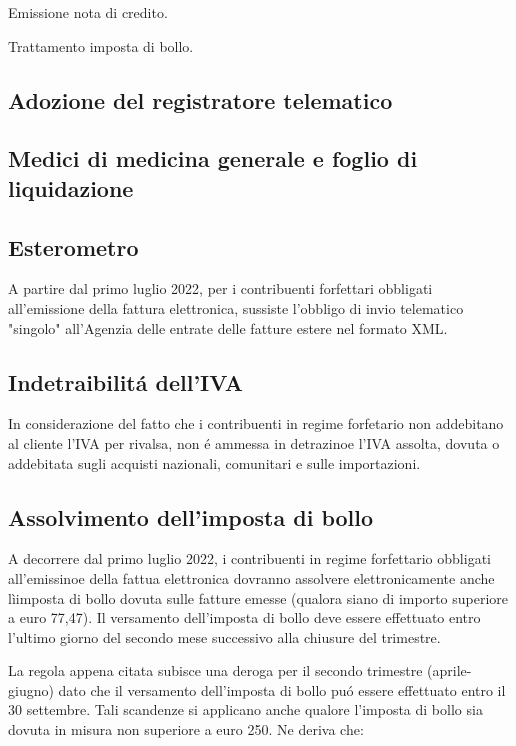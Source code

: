 \documentclass{article}
\begin{document}
Emissione nota di credito.

Trattamento imposta di bollo.

\subsection{Adozione del registratore telematico}
\subsection{Medici di medicina generale e foglio di liquidazione}

\subsection{Esterometro}
A partire dal primo luglio 2022, per i contribuenti forfettari obbligati all'emissione della fattura elettronica, sussiste l'obbligo di invio telematico "singolo" all'Agenzia delle entrate delle fatture estere nel formato XML.

\subsection{Indetraibilit\'a dell'IVA}
In considerazione del fatto che i contribuenti in regime forfetario non addebitano al cliente l'IVA per rivalsa, non \'e ammessa in detrazinoe l'IVA assolta, dovuta o addebitata sugli acquisti nazionali, comunitari e sulle importazioni.

\subsection{Assolvimento dell'imposta di bollo}
A decorrere dal primo luglio 2022, i contribuenti in regime forfettario obbligati all'emissinoe della fattua elettronica dovranno assolvere elettronicamente anche lìimposta di bollo dovuta sulle fatture emesse (qualora siano di importo superiore a euro 77,47). Il versamento dell'imposta di bollo deve essere effettuato entro l'ultimo giorno del secondo mese successivo alla chiusure del trimestre. 

La regola appena citata subisce una deroga per il secondo trimestre (aprile-giugno) dato che il versamento dell'imposta di bollo pu\'o essere effettuato entro il 30 settembre. Tali scandenze si applicano anche qualore l'imposta di bollo sia dovuta in misura non superiore a euro 250. Ne deriva che:
\end{document}
